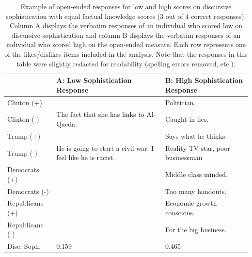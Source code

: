 \documentclass[12pt]{article}
\begin{document}
\begin{table}[ht]\footnotesize\centering
\begin{tabular}{l|p{6.3cm}|p{6.3cm}}
\toprule
	& A: Low Sophistication Response & B: High Sophistication Response \\ \midrule
Clinton (+)		& 																& Politician. \\\hdashline
Clinton (-)		& The fact that she has links to Al-Qaeda. 						& Caught in lies. \\\hdashline
Trump (+)		& 																& Says what he thinks. \\\hdashline
Trump (-)		& He is going to start a civil war. I feel like he is racist. 	& Reality TV star, poor businessman \\\hdashline
Democrats (+)	& 																& Middle class minded. \\\hdashline
Democrats (-)	& 																& Too many handouts. \\\hdashline
Republicans (+)	& 																& Economic growth conscious. \\\hdashline
Republicans (-)	& 																& For the big business. \\\midrule
Disc. Soph. 	& 0.159 														& 0.465 \\\bottomrule

 \end{tabular}
\caption{Example of open-ended responses for low and high scores on discursive sophistication with equal factual knowledge scores (3 out of 4 correct responses). Column A displays the verbatim responses of an individual who scored low on discursive sophistication and column B displays the verbatim responses of an individual who scored high on the open-ended measure. Each row represents one of the likes/dislikes items included in the analysis. Note that the responses in this table were slightly redacted for readability (spelling errors removed, etc.).}\label{tab:ex1}
\end{table}
\end{document}
